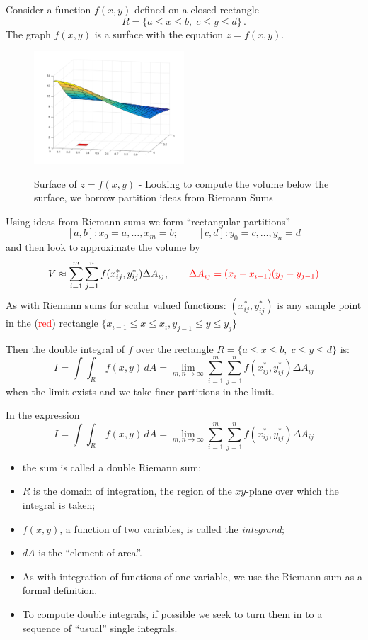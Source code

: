 \documentclass{article}
\begin{document}
Consider a function $f(x,y)$ defined on a closed rectangle
$$
R = \lbrace a \leq x \leq b, \; c \leq y \leq d \rbrace \,.
$$
The graph $f(x,y)$ is a surface with the equation $z=f(x,y)$.
\begin{figure}[!ht]
\vspace{-.2cm}
\centering
\includegraphics[width = 0.5\textwidth]{MIfig1.pdf}%
\label{Surface1}%
\caption{Surface of $z=f(x,y)$ - Looking to compute the volume below the surface, we borrow partition ideas from Riemann Sums}
\end{figure}


Using ideas from Riemann sums we form ``rectangular partitions''
$$
[a, b]: x_0 = a, \ldots , x_m = b; \qquad [c, d]: y_0 = c, \ldots, y_n = d
$$
and then look to approximate the volume by
$$
V \approx \sum_{i=1}^m \sum_{j=1}^n f(x_{ij}^{*},y_{ij}^*)\Delta A_{ij}, \qquad \textcolor{red}{\Delta A_{ij} = (x_i-x_{i-1})(y_j - y_{j-1})}
$$
As with Riemann sums for scalar valued functions: $(x_{ij}^{*},y_{ij}^*)$ is any sample
point in the (\textcolor{red}{red}) rectangle $\lbrace x_{i-1} \leq x \leq x_i, y_{j-1} \leq y \leq y_j \rbrace$

Then the double integral of $f$ over the rectangle $R = \lbrace a \leq x \leq b, \; c \leq y \leq d \rbrace$ is:
$$
I= \int \int_R \, f(x,y) \, dA = \lim_{m,n \to \infty}
\sum_{i=1}^m \sum_{j=1}^n f(x_{ij}^{*},y_{ij}^*)\Delta A_{ij}
$$
when the limit exists and we take finer partitions in the limit.


In the expression
$$
I= \int \int_R \, f(x,y) \, dA = \lim_{m,n \to \infty}
\sum_{i=1}^m \sum_{j=1}^n f(x_{ij}^{*},y_{ij}^*)\Delta A_{ij}
$$
\begin{itemize}
\item
the sum is called a double Riemann sum;
\item
$R$ is the domain of integration, the region of the $xy$-plane
over which the integral is taken;
\item
$f(x,y)$, a function of two variables, is called the {\it integrand}; 
\item
$dA$ is the ``element of area''.
\item
As with integration of functions of one variable, we use the Riemann sum as a formal definition. 
\item
To compute double integrals, if possible we seek to turn them in to a sequence of ``usual'' single integrals.
\end{itemize}
\end{document}
